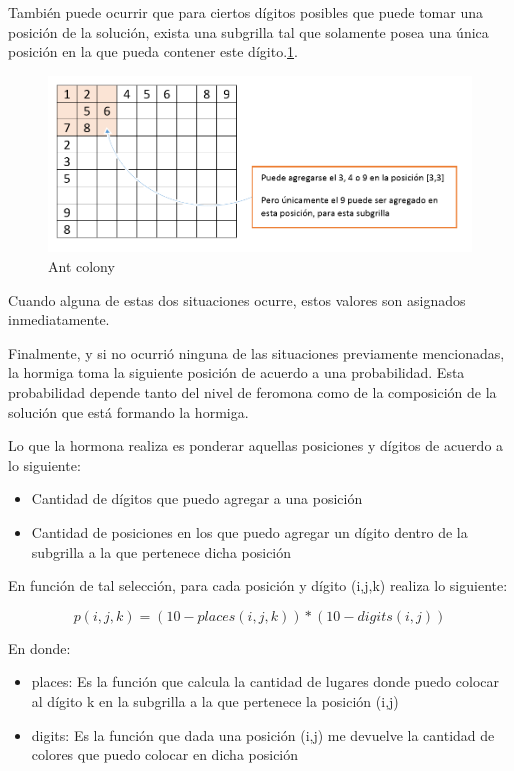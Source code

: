 \documentclass[a4paper,spanish]{article}
\begin{document}
También puede ocurrir que para ciertos dígitos posibles que puede tomar una posición de la solución, exista una subgrilla tal que 
solamente posea una única posición en la que pueda contener este dígito.\ref{img:undigitosolo}.

\begin{figure}
	\centering
	\includegraphics[scale=0.4]{./img/undigitosolo.png}
	\caption{Ant colony}
	\label{img:undigitosolo}
\end{figure}

Cuando alguna de estas dos situaciones ocurre, estos valores son asignados inmediatamente.

Finalmente, y si no ocurrió ninguna de las situaciones previamente mencionadas, la hormiga toma la siguiente posición de acuerdo 
a una probabilidad. Esta probabilidad depende tanto del nivel de feromona como de la composición de la solución que está formando la hormiga.

Lo que la hormona realiza es ponderar aquellas posiciones y dígitos de acuerdo a lo siguiente:

\begin{itemize}
	\item Cantidad de dígitos que puedo agregar a una posición
	\item Cantidad de posiciones en los que puedo agregar un dígito dentro de la subgrilla a la que pertenece dicha posición
\end{itemize}

En función de tal selección, para cada posición y dígito (i,j,k) realiza lo siguiente:

\begin{equation}
	p(i,j,k)=(10-places(i,j,k))*(10-digits(i,j))
\end{equation}

En donde:

\begin{itemize}
	\item places: Es la función que calcula la cantidad de lugares donde puedo colocar al dígito k en la subgrilla a la que pertenece la posición (i,j)
	\item digits: Es la función que dada una posición (i,j) me devuelve la cantidad de colores que puedo colocar en dicha posición
\end{itemize}
\end{document}
